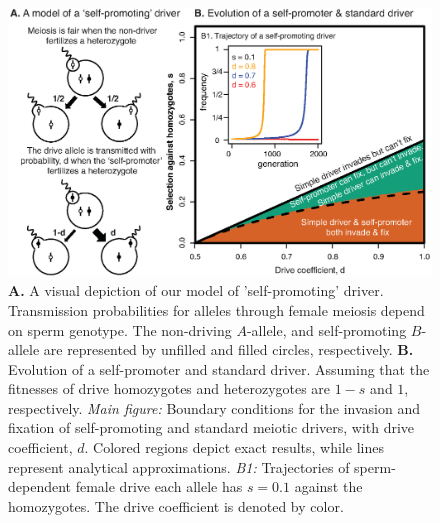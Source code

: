 \documentclass[12pt,letterpaper]{article}
\newcommand{\gc}[1]{{ \color{red} #1}}
\begin{document}
\begin{figure}
\includegraphics[width = 0.8 \textwidth]{Figures/selfprom.eps}
\caption{{\bf{A.}} A visual depiction of our model of 'self-promoting' driver. 
	Transmission probabilities for alleles through female
 	 meiosis depend on sperm genotype. 
	 The non-driving $A$-allele, and self-promoting $B$-allele
	 are represented by unfilled and filled circles, respectively. 
	 {\bf{B.}} Evolution of a self-promoter and standard driver. 
	 	Assuming that the fitnesses of drive homozygotes and 
		heterozygotes are $1-s$ and $1$, respectively. 
	 	\emph{Main figure:} Boundary conditions for the invasion 
		and fixation of self-promoting and standard meiotic drivers, 
		with drive coefficient, $d$. Colored regions depict exact results, 
		while lines  represent analytical approximations. 
	 \emph{B1:}  Trajectories of sperm-dependent female drive
		 each allele has $s =0.1$ against the
		 homozygotes.  The drive coefficient is denoted by color. 
 }   
\label{Eggsperm}
\end{figure}




\end{document}
